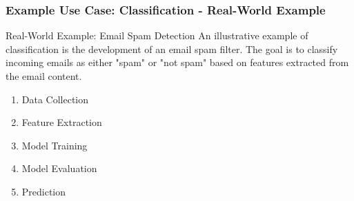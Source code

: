 \documentclass[aspectratio=169]{beamer}
\begin{document}
\begin{frame}[fragile]
    \frametitle{Example Use Case: Classification - Real-World Example}
    \begin{block}{Real-World Example: Email Spam Detection}
        An illustrative example of classification is the development of an email spam filter. The goal is to classify incoming emails as either "spam" or "not spam" based on features extracted from the email content.
    \end{block}
    
    \begin{enumerate}
        \item Data Collection
        \item Feature Extraction
        \item Model Training
        \item Model Evaluation
        \item Prediction
    \end{enumerate}
\end{frame}
\end{document}
